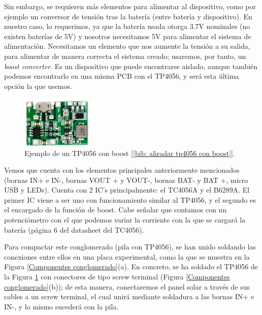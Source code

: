 \documentclass[12pt]{article}
\begin{document}
	\noindent Sin embargo, se requieren más elementos para alimentar al dispositivo, como por ejemplo un conversor de tensión tras la batería (entre batería y dispositivo). En nuestro caso, lo requerimos, ya que la batería usada otorga 3.7V nominales (no existen baterías de 5V) y nosotros necesitamos 5V para alimentar el sistema de alimentación. Necesitamos un elemento que nos aumente la tensión a su salida, para alimentar de manera correcta el sistema creado; usaremos, por tanto, un \textit{boost converter}. Es un dispositivo que puede encontrarse aislado, aunque también podemos encontrarlo en una misma PCB con el TP4056, y será esta última opción la que usemos. \\
	
	\begin{figure}[h]
		\begin{center}
			\includegraphics[width=0.3\textwidth]{img/tp4056_withBoost.png}
			\caption{Ejemplo de un TP4056 con boost [\ref{bib: aliradar tp4056 con boost}].}
			\label{TP4056 con boost}
		\end{center}
	\end{figure}
	
	\noindent Vemos que cuenta con los elementos principales anteriormente mencionados (bornas IN+ e IN-, bornas VOUT + y VOUT-, bornas BAT- y BAT
	+, micro USB y LEDs). Cuenta con 2 IC's principalmente: el TC4056A y el B6289A. El primer IC viene a ser uno con funcionamiento similar al TP4056, y el segundo es el encargado de la función de boost. Cabe señalar que contamos con un potenciómetro con el que podemos variar la corriente con la que se cargará la batería (página 6 del datasheet del TC4056). 
	

	
	\noindent Para compactar este conglomerado (pila  con TP4056), se han unido soldando las conexiones entre ellos en una placa experimental, como la que se muestra en la Figura \ref{Componentes conglomerado}(a). En concreto, se ha soldado el TP4056 de la Figura \ref{TP4056 con boost} con conectores de tipo screw terminal (Figura \ref{Componentes conglomerado}(b)); de esta manera, conectaremos el panel solar a través de sus cables a un screw terminal, el cual unirá mediante soldadura a las bornas IN+ e IN-, y lo mismo sucederá con la pila.
	
\end{document}
